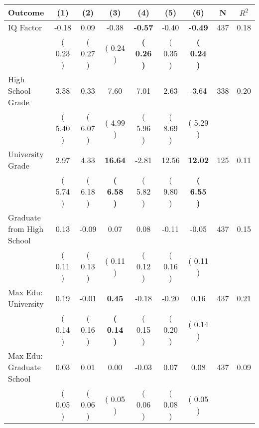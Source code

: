 \begin{tabular}{lcccccccc}
\toprule
 \textbf{Outcome} & \textbf{(1)} & \textbf{(2)} & \textbf{(3)} & \textbf{(4)} & \textbf{(5)} & \textbf{(6)} & \textbf{N} & \textbf{$ R^2$} \\
\midrule
IQ Factor &     -0.18 &      0.09 &     -0.38 & \textbf{    -0.57} &     -0.40 & \textbf{    -0.49} & 437 &       0.18 \\ 
 & (     0.23 ) & (     0.27 ) & (     0.24 ) & \textbf{(     0.26 )} & (     0.35 ) & \textbf{(     0.24 )} & \\
High School Grade &      3.58 &      0.33 &      7.60 &      7.01 &      2.63 &     -3.64 & 338 &       0.20 \\ 
 & (     5.40 ) & (     6.07 ) & (     4.99 ) & (     5.96 ) & (     8.69 ) & (     5.29 ) & \\
University Grade &      2.97 &      4.33 & \textbf{    16.64} &     -2.81 &     12.56 & \textbf{    12.02} & 125 &       0.11 \\ 
 & (     5.74 ) & (     6.18 ) & \textbf{(     6.58 )} & (     5.82 ) & (     9.80 ) & \textbf{(     6.55 )} & \\
Graduate from High School &      0.13 &     -0.09 &      0.07 &      0.08 &     -0.11 &     -0.05 & 437 &       0.15 \\ 
 & (     0.11 ) & (     0.13 ) & (     0.11 ) & (     0.12 ) & (     0.16 ) & (     0.11 ) & \\
Max Edu: University &      0.19 &     -0.01 & \textbf{     0.45} &     -0.18 &     -0.20 &      0.16 & 437 &       0.21 \\ 
 & (     0.14 ) & (     0.16 ) & \textbf{(     0.14 )} & (     0.15 ) & (     0.20 ) & (     0.14 ) & \\
Max Edu: Graduate School &      0.03 &      0.01 &      0.00 &     -0.03 &      0.07 &      0.08 & 437 &       0.09 \\ 
 & (     0.05 ) & (     0.06 ) & (     0.05 ) & (     0.06 ) & (     0.08 ) & (     0.05 ) & \\
\bottomrule
\end{tabular}
